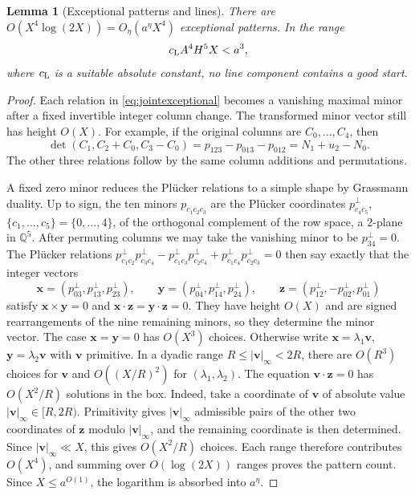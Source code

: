 \documentclass[11pt]{article}
\newtheorem{lemma}[theorem]{Lemma}
\theoremstyle{definition}
\theoremstyle{remark}
\begin{document}
\begin{lemma}[Exceptional patterns and lines]\label{lem:jointcomponents}
There are $O(X^4\log(2X))=O_\eta(a^\eta X^4)$ exceptional patterns. In the range
\begin{equation}\label{eq:jointscale}
 c_{\rm L} A^4H^5X<a^3,
\end{equation}
where $c_{\rm L}$ is a suitable absolute constant, no line component contains a good start.
\end{lemma}
\begin{proof}
Each relation in \eqref{eq:jointexceptional} becomes a vanishing maximal
minor after a fixed invertible integer column change. The transformed
minor vector still has height $O(X)$. For example, if the original columns
are $C_0,\dots,C_4$, then
\[
 \det(C_1,C_2+C_0,C_3-C_0)=p_{123}-p_{013}-p_{012}
                              =N_1+u_2-N_0.
\]
The other three relations follow by the same column additions and
permutations.

A fixed zero minor reduces the Pl\"ucker relations to a simple shape by
Grassmann duality. Up to sign, the ten minors $p_{c_1c_2c_3}$ are the Pl\"ucker
coordinates $p^\perp_{c_4c_5}$, $\{c_1,\dots,c_5\}=\{0,\dots,4\}$, of the orthogonal
complement of the row space, a $2$-plane in $\mathbb Q^5$. After permuting
columns we may take the vanishing minor to be $p^\perp_{34}=0$. The Pl\"ucker
relations $p^\perp_{c_1c_2}p^\perp_{c_3c_4}-p^\perp_{c_1c_3}p^\perp_{c_2c_4}+p^\perp_{c_1c_4}p^\perp_{c_2c_3}=0$ then say exactly that
the integer vectors
\[
 \mathbf x=(p^\perp_{03},p^\perp_{13},p^\perp_{23}),\qquad \mathbf y=(p^\perp_{04},p^\perp_{14},p^\perp_{24}),\qquad
 \mathbf z=(p^\perp_{12},-p^\perp_{02},p^\perp_{01})
\]
satisfy $\mathbf x\times\mathbf y=0$ and
$\mathbf x\cdot\mathbf z=\mathbf y\cdot\mathbf z=0$. They have height $O(X)$
and are signed rearrangements of the nine remaining minors, so they determine
the minor vector.
The case $\mathbf x=\mathbf y=0$ has $O(X^3)$ choices. Otherwise write
$\mathbf x=\lambda_1\mathbf v$, $\mathbf y=\lambda_2\mathbf v$ with $\mathbf v$ primitive.
In a dyadic range $R\le|\mathbf v|_\infty<2R$, there are $O(R^3)$
choices for $\mathbf v$ and $O((X/R)^2)$ for $(\lambda_1,\lambda_2)$.
The equation $\mathbf v\cdot\mathbf z=0$ has $O(X^2/R)$ solutions
in the box. Indeed, take a coordinate of $\mathbf v$ of absolute value
$|\mathbf v|_\infty\in[R,2R)$. Primitivity gives $|\mathbf v|_\infty$ admissible pairs
of the other two coordinates of $\mathbf z$ modulo $|\mathbf v|_\infty$, and the
remaining coordinate is then determined. Since $|\mathbf v|_\infty\ll X$, this gives
$O(X^2/R)$ choices.
Each range therefore contributes $O(X^4)$, and summing over $O(\log(2X))$
ranges proves the pattern count. Since $X\le a^{O(1)}$, the logarithm is
absorbed into $a^\eta$.


\end{proof}
\end{document}
